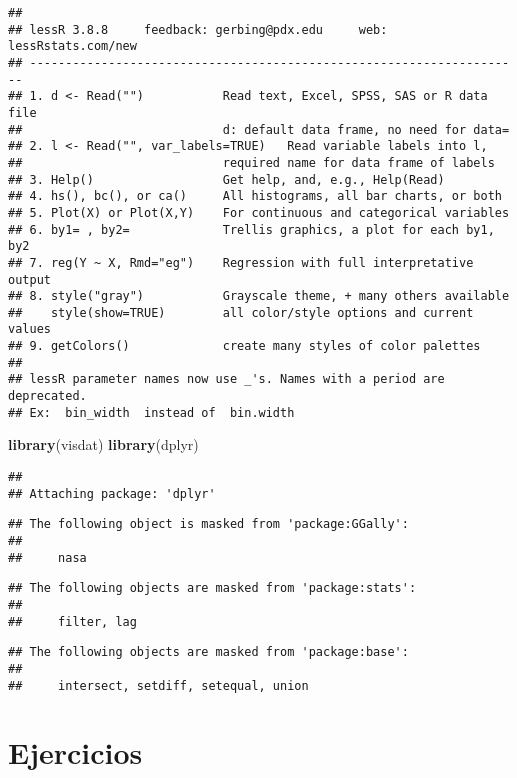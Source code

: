 \documentclass[]{article}
\newenvironment{Shaded}{\begin{snugshade}}{\end{snugshade}}
\newcommand{\KeywordTok}[1]{\textcolor[rgb]{0.13,0.29,0.53}{\textbf{#1}}}
\newcommand{\NormalTok}[1]{#1}
\begin{document}
\begin{verbatim}
## 
## lessR 3.8.8     feedback: gerbing@pdx.edu     web: lessRstats.com/new
## ---------------------------------------------------------------------
## 1. d <- Read("")           Read text, Excel, SPSS, SAS or R data file
##                            d: default data frame, no need for data=
## 2. l <- Read("", var_labels=TRUE)   Read variable labels into l,
##                            required name for data frame of labels
## 3. Help()                  Get help, and, e.g., Help(Read)
## 4. hs(), bc(), or ca()     All histograms, all bar charts, or both
## 5. Plot(X) or Plot(X,Y)    For continuous and categorical variables
## 6. by1= , by2=             Trellis graphics, a plot for each by1, by2
## 7. reg(Y ~ X, Rmd="eg")    Regression with full interpretative output
## 8. style("gray")           Grayscale theme, + many others available
##    style(show=TRUE)        all color/style options and current values
## 9. getColors()             create many styles of color palettes
## 
## lessR parameter names now use _'s. Names with a period are deprecated.
## Ex:  bin_width  instead of  bin.width
\end{verbatim}

\begin{Shaded}
\begin{Highlighting}[]
\KeywordTok{library}\NormalTok{(visdat)}
\KeywordTok{library}\NormalTok{(dplyr)}
\end{Highlighting}
\end{Shaded}

\begin{verbatim}
## 
## Attaching package: 'dplyr'
\end{verbatim}

\begin{verbatim}
## The following object is masked from 'package:GGally':
## 
##     nasa
\end{verbatim}

\begin{verbatim}
## The following objects are masked from 'package:stats':
## 
##     filter, lag
\end{verbatim}

\begin{verbatim}
## The following objects are masked from 'package:base':
## 
##     intersect, setdiff, setequal, union
\end{verbatim}

\hypertarget{ejercicios}{%
\section{Ejercicios}\label{ejercicios}}
\end{document}
